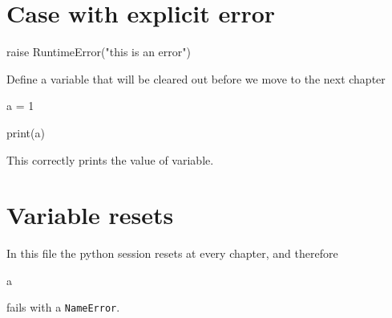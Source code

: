 \documentclass[oneside]{book}
\begin{document}
\chapter{Case with explicit error}

\begin{pycell}
raise RuntimeError("this is an error")
\end{pycell}

Define a variable that will be cleared out before we move to the next chapter

\begin{pycell}
a = 1
\end{pycell}

\begin{pycell}
print(a)
\end{pycell}

This correctly prints the value of variable.

\chapter{Variable resets}

In this file the python session resets at every chapter, and therefore

\begin{pycell}
a
\end{pycell}

fails with a \texttt{NameError}.

\ifPythonTeXLoaded
\else
\fi
\end{document}
